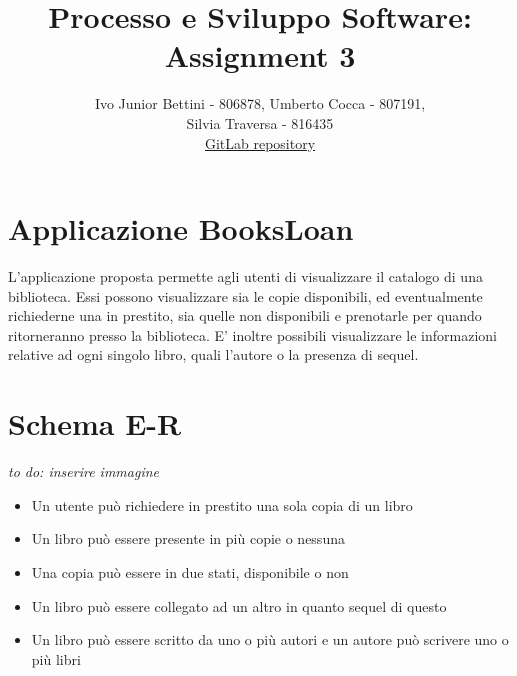 \documentclass[a4paper,10pt]{article}
\title{Processo e Sviluppo Software: Assignment 3}
\author{Ivo Junior Bettini - 806878, Umberto Cocca - 807191, \\Silvia Traversa - 816435\\
\href{https://gitlab.com/s.traversa/2019_assignment3_booksloan}{GitLab repository}}
\date{}
\begin{document}
\maketitle 


\section*{Applicazione BooksLoan}
L'applicazione proposta permette agli utenti di visualizzare il catalogo di una biblioteca. Essi possono visualizzare sia le copie disponibili, ed eventualmente richiederne una in prestito, sia quelle non disponibili e prenotarle per quando ritorneranno presso la biblioteca.
E' inoltre possibili visualizzare le informazioni relative ad ogni singolo libro, quali l'autore o la presenza di sequel. 

\section*{Schema E-R}
\textit{to do: inserire immagine}
\begin{itemize}
	\item Un utente può richiedere in prestito una sola copia di un libro
	\item Un libro può essere presente in più copie o nessuna
	\item Una copia può essere in due stati, disponibile o non
	\item Un libro può essere collegato ad un altro in quanto sequel di questo
	\item Un libro può essere scritto da uno o più autori e un autore può scrivere uno o più libri
\end{itemize}
\end{document}
